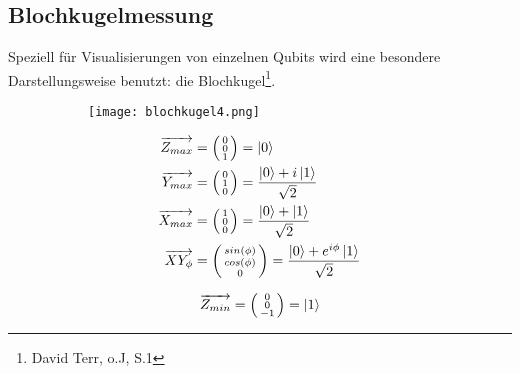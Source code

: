 \documentclass[12pt]{report}
\begin{document}
\subsection{Blochkugelmessung}	
Speziell für Visualisierungen von einzelnen Qubits wird eine besondere Darstellungsweise benutzt: die Blochkugel\footnote{David Terr, o.J, S.1}.
	\begin{figure}[h]
		\centering
		\begin{subfigure}{.34\textwidth}
		\centering
		\texttt{[image: blochkugel4.png]}
		\end{subfigure}
		\begin{subfigure}{.27\textwidth}
  		\begin{align*}
  			\overrightarrow{Z_{max}} &= \left( \begin{smallmatrix} 0\\0\\1 \end{smallmatrix} \right) = \ket{0} \\
  			\overrightarrow{Y_{max}} &= \left( \begin{smallmatrix} 0\\1\\0 \end{smallmatrix} \right) = \frac{\ket{0}+i\ket{1}}{\sqrt{2}} \\
  			\overrightarrow{X_{max}} &= \left( \begin{smallmatrix} 1\\0\\0 \end{smallmatrix} \right) = \frac{\ket{0}+\ket{1}}{\sqrt{2}} \\
  			\overrightarrow{XY_{\phi}} &= \left( \begin{smallmatrix} sin(\phi)\\cos(\phi)\\0 \end{smallmatrix} \right) = \frac{\ket{0}+e^{i\phi}\ket{1}}{\sqrt{2}}
  		\end{align*}
		\end{subfigure}
		\begin{subfigure}{.27\textwidth}
  		\begin{align*}
  			\overrightarrow{Z_{min}} &= \left( \begin{smallmatrix} 0\\0\\-1 \end{smallmatrix} \right) = \ket{1} \\

\end{align*}
\end{subfigure}
\end{figure}
\end{document}
